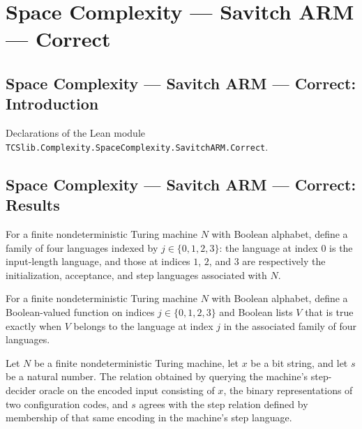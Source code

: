 \section{Space Complexity --- Savitch ARM --- Correct}
\subsection*{Space Complexity --- Savitch ARM --- Correct: Introduction}

Declarations of the Lean module \texttt{TCSlib.Complexity.SpaceComplexity.SavitchARM.Correct}.

\subsection*{Space Complexity --- Savitch ARM --- Correct: Results}

\begin{definition}
\label{Complexity.LogProg.SavitchARM.decs}
\leanok
{}
For a finite nondeterministic Turing machine $N$ with Boolean alphabet, define a family
of four languages indexed by $j\in\{0,1,2,3\}$: the language at index $0$ is the
input-length language, and those at indices $1$, $2$, and $3$ are respectively the
initialization, acceptance, and step languages associated with $N$.
\end{definition}

\begin{definition}
\label{Complexity.LogProg.SavitchARM.orcN}
\leanok
{}
For a finite nondeterministic Turing machine $N$ with Boolean alphabet, define a
Boolean-valued function on indices $j\in\{0,1,2,3\}$ and Boolean lists $V$ that is true
exactly when $V$ belongs to the language at index $j$ in the associated family of four
languages.
\end{definition}

\begin{lemma}
\label{Complexity.LogProg.SavitchARM.rel_orcN}
\leanok
{}
Let $N$ be a finite nondeterministic Turing machine, let $x$ be a bit string, and let
$s$ be a natural number. The relation obtained by querying the machine’s step-decider
oracle on the encoded input consisting of $x$, the binary representations of two
configuration codes, and $s$ agrees with the step relation defined by membership of that
same encoding in the machine’s step language.
\end{lemma}

